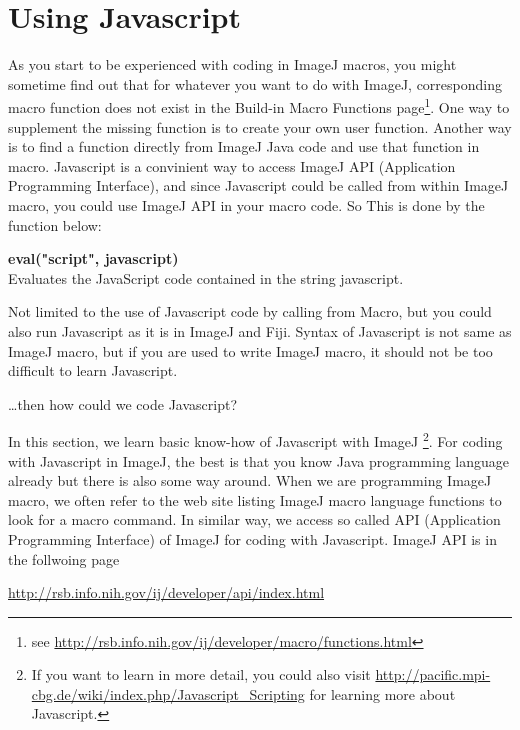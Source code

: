 \documentclass[11pt,a4paper,oneside]{report}
\newenvironment{indentCom}%
{\begin{list}{}%
         {\setlength{\leftmargin}{1em}}%
         \item[]%
}
{\end{list}}
\begin{document}
\newpage

\section{Using Javascript}

As you start to be experienced with coding in ImageJ macros, you might sometime find out that for whatever you want to do with ImageJ, corresponding macro function does not exist in the Build-in Macro Functions page\footnote{ see \url{http://rsb.info.nih.gov/ij/developer/macro/functions.html}}. One way to supplement the missing function is to create your own user function. Another way is to find a function directly from ImageJ Java code and use that function in macro. Javascript is a convinient way to access ImageJ API (Application Programming Interface), and since Javascript could be called from within ImageJ macro, you could use ImageJ API in your macro code. So This is done by the function below: 
\begin{shaded}
\begin{indentCom}
\item \textbf{eval("script", javascript)}\\
Evaluates the JavaScript code contained in the string javascript.\\
\end{indentCom}
\end{shaded}

Not limited to the use of Javascript code by calling from Macro, but you could also run Javascript as it is in ImageJ and Fiji. Syntax of Javascript is not same as ImageJ macro, but if you are used to write ImageJ macro, it should  not be too difficult to learn Javascript.  
 
\dots then how could we code Javascript? 

In this section, we learn basic know-how of Javascript with ImageJ \footnote{ If you want to learn in more detail, you could also visit \url{http://pacific.mpi-cbg.de/wiki/index.php/Javascript_Scripting} for learning more about Javascript.}. For coding with Javascript in ImageJ, the best is that you know Java programming language already but there is also some way around. When we are programming ImageJ macro, we often refer to the web site listing ImageJ macro language functions to look for a macro command. In similar way, we access so called API (Application Programming Interface) of ImageJ for coding with Javascript. ImageJ API is in the follwoing page

\url{http://rsb.info.nih.gov/ij/developer/api/index.html}
\end{document}
